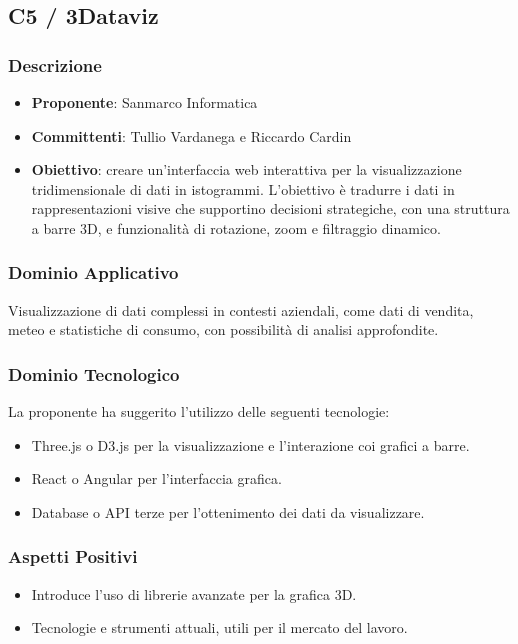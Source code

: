 \documentclass[a4paper, 12pt]{article}
\begin{document}
\subsection{C5 / 3Dataviz}
\subsubsection{Descrizione}
\begin{itemize}
    \item \textbf{Proponente}: Sanmarco Informatica
    \item \textbf{Committenti}: Tullio Vardanega e Riccardo Cardin
    \item \textbf{Obiettivo}: creare un'interfaccia web interattiva per la visualizzazione tridimensionale di dati in istogrammi. L’obiettivo è tradurre i dati in rappresentazioni visive che supportino decisioni strategiche, con una struttura a barre 3D, e funzionalità di rotazione, zoom e filtraggio dinamico.

\end{itemize}

\subsubsection{Dominio Applicativo}
Visualizzazione di dati complessi in contesti aziendali, come dati di vendita, meteo e statistiche di consumo, con possibilità di analisi approfondite.

\subsubsection{Dominio Tecnologico}
La proponente ha suggerito l’utilizzo delle seguenti tecnologie:
\begin{itemize}
    \item Three.js o  D3.js  per la visualizzazione e l'interazione coi grafici a barre.
    \item React o Angular per l’interfaccia grafica.
    \item Database o API terze per l’ottenimento dei dati da visualizzare.
\end{itemize}

\subsubsection{Aspetti Positivi}
\begin{itemize}
    \item Introduce l'uso di librerie avanzate per la grafica 3D.
    \item Tecnologie e strumenti attuali, utili per il mercato del lavoro.
\end{itemize}
\end{document}
